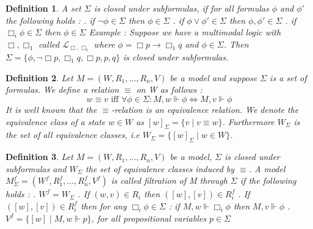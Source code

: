 \documentclass[12pt, a4paper]{scrartcl}
\newtheorem{definition}{Definition}[subsection]
\begin{document}
\begin{definition}
    A set $\Sigma$ is closed under subformulas, if for all formulas $\phi$ and $\phi'$ the following holds :
    \newline {}. if $\neg \phi \in \Sigma$ then $\phi \in \Sigma$
    . if $\phi \lor \phi' \in \Sigma$ then $\phi, \phi' \in \Sigma$
    . if $\Box_i \phi \in \Sigma$ then $\phi \in \Sigma$
    \newline
    \newline
    Example : Suppose we have a multimodal logic with $\Box, \Box_1$ called $\mathcal{L}_{\Box, \Box_1}$ where $\phi = \Box p \rightarrow \Box_1 q$ and $\phi \in \Sigma$. Then $\Sigma = \{ \phi, \neg\Box p, \Box_1 q, \Box p, p, q\}$ is closed under
    subformulas.
\end{definition}

\begin{definition}
    Let $M = (W,R_1,...,R_n,V)$ be a model and suppose $\Sigma$ is a set of formulas. We define a relation $\equiv$ on W as follows : \newline 
    $$w \equiv v \mbox{ iff } \forall \phi \in \Sigma : M,w \Vdash \phi \Leftrightarrow M,v \Vdash \phi$$ 
    It is well known that the $\equiv$-relation is an equivalence relation. We denote the equivalence class of a state $w\in W$ as $[w]_\Sigma = \{v \mid v \equiv w\}$. Furthermore $W_\Sigma$ is the set of all equivalence classes, i.e
    $W_\Sigma = \{[w]_\Sigma \mid w \in W\}$.    
\end{definition}

\begin{definition}
    Let $M = (W,R_1,...,R_n,V)$ be a model, $\Sigma$ is closed under subformulas and $W_\Sigma$ the set of equivalence classes induced by $\equiv$.
    A model $M^f_\Sigma = (W^f, R_1^f,...,R_n^f, V^f)$ is called filtration of M through $\Sigma$ if the following holds : \newline {}. $W^f = W_\Sigma$ . If $(w,v) \in R_i$ then $([w],[v]) \in R^f_i$ . If $([w], [v]) \in R^f_i$ then for any $\Box_i \phi \in \Sigma$ : if $M,w \Vdash \Box_i \phi$ then $M,v \Vdash \phi$  . $V^f = \{[w] \mid M,w \Vdash p\}$, for all propositional variables $p \in \Sigma$      
\end{definition}
\end{document}
